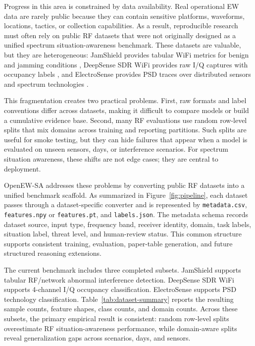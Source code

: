 \documentclass[11pt]{article}
\newcommand{\artifact}[1]{\texttt{#1}}
\begin{document}
Progress in this area is constrained by data availability. Real operational EW data are rarely public because they can contain sensitive platforms, waveforms, locations, tactics, or collection capabilities. As a result, reproducible research must often rely on public RF datasets that were not originally designed as a unified spectrum situation-awareness benchmark. These datasets are valuable, but they are heterogeneous: JamShield provides tabular WiFi metrics for benign and jamming conditions \cite{panitsas2025jamshield,panitsas2024jamshieldDatasetGithub,panitsas2024jamshieldDatasetDataport}, DeepSense SDR WiFi provides raw I/Q captures with occupancy labels \cite{uvaydov2021deepsense,wiotlab2021deepsenseGithub}, and ElectroSense provides PSD traces over distributed sensors and spectrum technologies \cite{scalingi2023wirelessTechnologyClassification,scalingi2023electrosensePsdDataset,rajendran2017electrosenseOpenBig}.

This fragmentation creates two practical problems. First, raw formats and label conventions differ across datasets, making it difficult to compare models or build a cumulative evidence base. Second, many RF evaluations use random row-level splits that mix domains across training and reporting partitions. Such splits are useful for smoke testing, but they can hide failures that appear when a model is evaluated on unseen sensors, days, or interference scenarios. For spectrum situation awareness, these shifts are not edge cases; they are central to deployment.

OpenEW-SA addresses these problems by converting public RF datasets into a unified benchmark scaffold. As summarized in Figure~\ref{fig:pipeline}, each dataset passes through a dataset-specific converter and is represented by \artifact{metadata.csv}, \artifact{features.npy} or \artifact{features.pt}, and \artifact{labels.json}. The metadata schema records dataset source, input type, frequency band, receiver identity, domain, task labels, situation label, threat level, and human-review status. This common structure supports consistent training, evaluation, paper-table generation, and future structured reasoning extensions.

The current benchmark includes three completed subsets. JamShield supports tabular RF/network abnormal interference detection. DeepSense SDR WiFi supports 4-channel I/Q occupancy classification. ElectroSense supports PSD technology classification. Table~\ref{tab:dataset-summary} reports the resulting sample counts, feature shapes, class counts, and domain counts. Across these subsets, the primary empirical result is consistent: random row-level splits overestimate RF situation-awareness performance, while domain-aware splits reveal generalization gaps across scenarios, days, and sensors.
\end{document}
